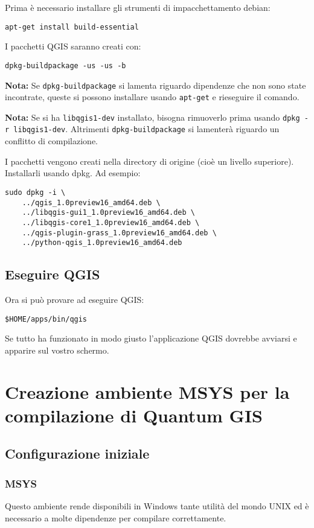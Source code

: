 Prima è necessario installare gli strumenti di impacchettamento debian:

\begin{verbatim}
apt-get install build-essential
\end{verbatim}

I pacchetti QGIS saranno creati con:

\begin{verbatim}
dpkg-buildpackage -us -us -b
\end{verbatim}

\textbf{Nota:} Se \texttt{dpkg-buildpackage} si lamenta riguardo dipendenze che non sono state incontrate, queste si possono installare usando \texttt{apt-get} e rieseguire il comando.

\textbf{Nota:} Se si ha \texttt{libqgis1-dev} installato, bisogna rimuoverlo prima usando \texttt{dpkg -r libqgis1-dev}.  Altrimenti \texttt{dpkg-buildpackage} si lamenterà riguardo un conflitto di compilazione.

I pacchetti vengono creati nella directory di origine (cioè un livello superiore).
Installarli usando dpkg.  Ad esempio:

\begin{verbatim}
sudo dpkg -i \
	../qgis_1.0preview16_amd64.deb \
	../libqgis-gui1_1.0preview16_amd64.deb \
	../libqgis-core1_1.0preview16_amd64.deb \
	../qgis-plugin-grass_1.0preview16_amd64.deb \
	../python-qgis_1.0preview16_amd64.deb
\end{verbatim}

\subsection{Eseguire QGIS}
Ora si può provare ad eseguire QGIS:

\begin{verbatim}
$HOME/apps/bin/qgis 
\end{verbatim}

Se tutto ha funzionato in modo giusto l'applicazione QGIS dovrebbe avviarsi e apparire sul vostro schermo.

\section{Creazione ambiente MSYS per la compilazione di Quantum GIS}
\subsection{Configurazione iniziale}
\subsubsection{MSYS}
Questo ambiente rende disponibili in Windows tante utilità del mondo UNIX ed è necessario a molte dipendenze per compilare correttamente.

